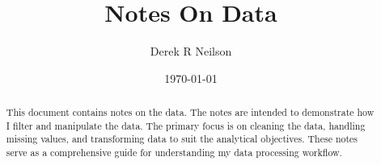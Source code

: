 \documentclass{report} %
\title{Notes On Data}
\author{Derek R Neilson}
\date{\today}
\begin{document}
\maketitle

\begin{abstract}
  This document contains notes on the data. The notes are intended to demonstrate how I filter and manipulate the data. The primary focus is on cleaning the data, handling missing values, and transforming data to suit the analytical objectives. These notes serve as a comprehensive guide for understanding my data processing workflow. 
\end{abstract}


\end{document}
